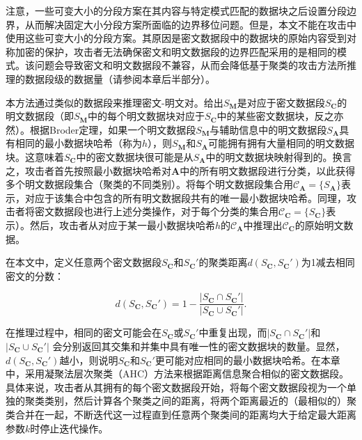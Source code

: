 注意，一些可变大小的分段方案在其内容与特定模式匹配的数据块之后设置分段边界，从而解决固定大小分段方案所面临的边界移位问题。但是，本文不能在攻击中使用这些可变大小的分段方案。其原因是密文数据段中的数据块的原始内容受到对称加密的保护，攻击者无法确保密文和明文数据段的边界匹配采用的是相同的模式。该问题会导致密文和明文数据段不兼容，从而会降低基于聚类的攻击方法所推理的数据段级的数据量（请参阅本章后半部分）。
 
本方法通过类似的数据段来推理密文-明文对。给出$S_\mathbf{M}$是对应于密文数据段$S_\mathbf{C}$的明文数据段（即$S_\mathbf{M}$中的每个明文数据块对应于$S_\mathbf{C}$中的某些密文数据块，反之亦然）。根据Broder定理，如果一个明文数据段$S_\mathbf{M}$与辅助信息中的明文数据段$S_\mathbf{A}$具有相同的最小数据块哈希（称为$h$），则$S_\mathbf{M}$和$S_\mathbf{A}$可能拥有拥有大量相同的明文数据块。这意味着$S_\mathbf{C}$中的密文数据块很可能是从$S_\mathbf{A}$中的明文数据块映射得到的。换言之，攻击者首先按照最小数据块哈希对$\mathbf{A}$中的所有明文数据段进行分类，以此获得多个明文数据段集合（聚类的不同类别）。将每个明文数据段集合用$\mathcal{C}_\mathbf{A} = \{ S_\mathbf{A} \}$表示，对应于该集合中包含的所有明文数据段共有的唯一最小数据块哈希。同理，攻击者将密文数据段也进行上述分类操作，对于每个分类的集合用$\mathcal{C}_\mathbf{C} = \{ S_\mathbf{C} \}$表示）。然后，攻击者从对应于某一最小数据块哈希$h$的$\mathcal{C}_\mathbf{A}$中推理出$\mathcal{C}_\mathbf{C}$的原始明文数据。  

在本文中，定义任意两个密文数据段$S_\mathbf{C}$和$S_\mathbf{C}'$的聚类距离$d(S_\mathbf{C},S_\mathbf{C}')$为1减去相同密文的分数：

\begin{equation}
\label{eq:distence}
    d(S_\mathbf{C}, S_\mathbf{C}') = 1 - \frac{|S_\mathbf{C} \cap S_\mathbf{C}'|}{|S_\mathbf{C} \cup S_\mathbf{C}'|}.
\end{equation}

在推理过程中，相同的密文可能会在$S_\mathbf{C}$或$S_\mathbf{C}'$中重复出现，而$|S_\mathbf{C} \cap S_\mathbf{C}'|$和$|S_\mathbf{C} \cup S_\mathbf{C}'|$ 会分别返回其交集和并集中具有唯一性的密文数据块的数量。显然，$d(S_\mathbf{C}, S_\mathbf{C}')$越小，则说明$S_\mathbf{C}$和$S_\mathbf{C}'$更可能对应相同的最小数据块哈希。在本章中，采用凝聚法层次聚类（AHC）方法来根据距离信息聚合相似的密文数据段。具体来说，攻击者从其拥有的每个密文数据段开始，将每个密文数据段视为一个单独的聚类类别，然后计算各个聚类之间的距离，将两个距离最近的（最相似的）聚类合并在一起，不断迭代这一过程直到任意两个聚类间的距离均大于给定最大距离参数$k$时停止迭代操作。
 
